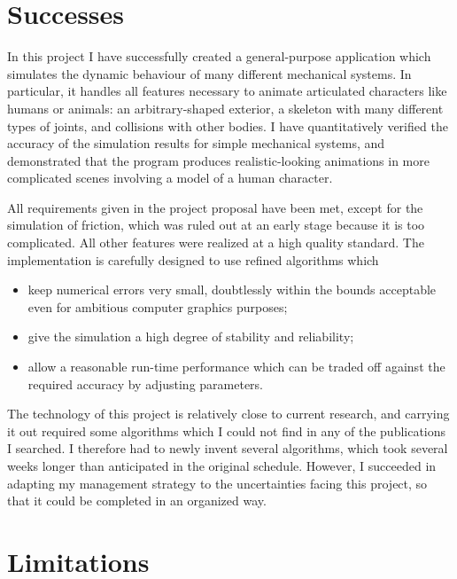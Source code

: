 \section{Successes}

In this project I have successfully created a general-purpose application which simulates
the dynamic behaviour of many different mechanical systems. In particular, it handles all
features necessary to animate articulated characters like humans or animals: an
arbitrary-shaped exterior, a skeleton with many different types of joints, and
collisions with other bodies. I have quantitatively verified the accuracy of the simulation
results for simple mechanical systems, and demonstrated that the program produces
realistic-looking animations in more complicated scenes involving a
model of a human character.

All requirements given in the project proposal have been met, except for the simulation of friction,
which was ruled out at an early stage because it is too complicated. All other features were
realized at a high quality standard. The implementation is carefully designed to use refined
algorithms which 
\begin{itemize}
\item keep numerical errors very small, doubtlessly within the bounds acceptable even for
    ambitious computer graphics purposes;
\item give the simulation a high degree of stability and reliability;
\item allow a reasonable run-time performance which can be traded off against the required
    accuracy by adjusting parameters.
\end{itemize}

The technology of this project is relatively close to current research, and carrying it out
required some algorithms which I could not find in any of the publications I searched. I therefore
had to newly invent several algorithms, which took several weeks longer than anticipated in
the original schedule. However, I succeeded in adapting my management strategy
to the uncertainties facing this project, so that it could be completed in an organized way.

\section{Limitations}


